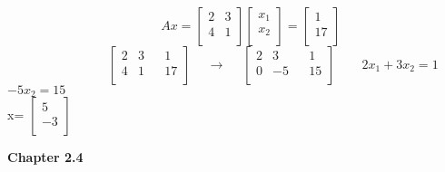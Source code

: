 \documentclass[10pt,twoside,reqno]{article}
\begin{document}
\begin{enumerate}
\vspace{3mm}
$
$$
\hspace{145pt}
Ax=
\begin{bmatrix}
2&3\\
4&1\\
\end{bmatrix}
\begin{bmatrix}
x_{1}\\
x_{2}\\
\end{bmatrix}
=
\begin{bmatrix}
1\\
17\\
\end{bmatrix}
$$
$ \\
\vspace{3mm}
$
$$
\hspace{95pt}
\begin{bmatrix}
2&3&&1\\
4&1&&17\\
\end{bmatrix}
\hspace{15pt}
\rightarrow
\hspace{15pt}
\begin{bmatrix}
2&3&&1\\
0&-5&&15\\
\end{bmatrix}
\hspace{25pt}
2x_1+3x_2=1
$$
$ \\
\hspace{313pt}
$-5x_2=15$
\\
\hspace{185pt}
x=
$
$$
\begin{bmatrix}
5\\
-3\\
\end{bmatrix}
$$
$
\end{enumerate}
\vspace{5mm}
\textbf{Chapter 2.4}
\end{document}
